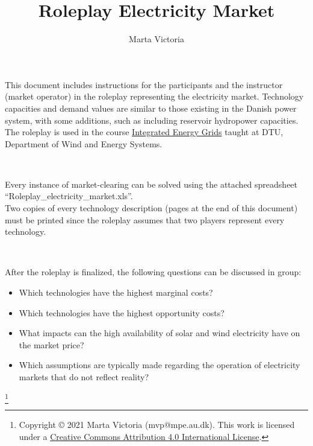 \documentclass[3p]{elsarticle} %
\newcommand\blfootnote[1]{
  \begingroup
  \renewcommand\thefootnote{}\footnote{#1}
  \addtocounter{footnote}{-1}
  \endgroup
}
\begin{document}
\begin{frontmatter}

\title{ \textbf{Roleplay Electricity Market}}

\author[mymainaddress]{Marta Victoria}
\address[mymainaddress]{Department of Wind and Energy Systems, Technical University of Denmark (DTU)}

\end{frontmatter}
\thispagestyle{fancy}


This document includes instructions for the participants and the instructor (market operator) in the roleplay representing the electricity market. Technology capacities and demand values are similar to those existing in the Danish power system, with some additions, such as including reservoir hydropower capacities. The roleplay is used in the course \href{https://kurser.dtu.dk/course/2024-2025/46770?menulanguage=en}{Integrated Energy Grids} taught at DTU, Department of Wind and Energy Systems.

\

Every instance of market-clearing can be solved using the attached spreadsheet “Roleplay\_electricity\_market.xls”.\\

Two copies of every technology description (pages at the end of this document) must be printed since the roleplay assumes that two players represent every technology.

\

After the roleplay is finalized, the following questions can be discussed in group:

\begin{itemize}
\item Which technologies have the highest marginal costs?
\item Which technologies have the highest opportunity costs?
\item What impacts can the high availability of solar and wind electricity have on the market price?
\item Which assumptions are typically made regarding the operation of electricity markets that do not reflect reality?
\end{itemize}


\blfootnote{Copyright © 2021 Marta Victoria (mvp@mpe.au.dk). This work is licensed under a \href{https://creativecommons.org/licenses/by/4.0/} {Creative Commons Attribution 4.0 International License}.}


\newpage
\end{document}
